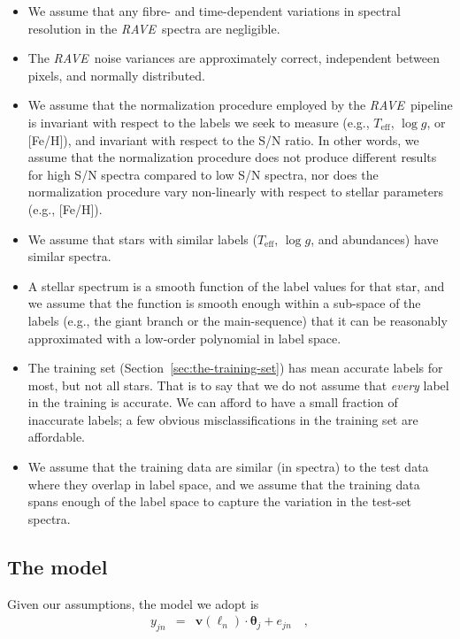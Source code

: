\documentclass[preprint]{aastex}
\newcommand{\acronym}[1]{{\small{#1}}}
\newcommand{\project}[1]{\textsl{#1}}
\newcommand{\rave}{\project{\acronym{RAVE}}}
\newcommand{\teff}{T_{\mathrm{eff}}}
\newcommand{\logg}{\log g}
\newcommand{\Dvector}[1]{\boldsymbol{#1}}
\newcommand{\vectheta}{\Dvector{\theta}}
\newcommand{\vecv}{\Dvector{v}}
\begin{document}
\begin{itemize}
\item We assume that any fibre- and time-dependent variations in spectral
resolution in the \rave\ spectra are negligible.
\item The \rave\ noise variances are approximately correct, independent between
pixels, and normally distributed.
\item We assume that the normalization procedure employed by the \rave\ pipeline
is invariant with respect to the labels we seek to measure (e.g., $\teff$, $\logg$,
or [Fe/H]), and invariant with respect to the S/N ratio.  In other words, we assume
that the normalization procedure does not produce different results for high S/N
spectra compared to low S/N spectra, nor does the normalization procedure vary 
non-linearly with respect to stellar parameters (e.g., [Fe/H]).
\item We assume that stars with similar labels ($\teff$, $\logg$, and abundances)
have similar spectra.
\item A stellar spectrum is a smooth function of the label values for that star,
and we assume that the function is smooth enough within a sub-space of the labels
(e.g., the giant branch or the main-sequence) that it can be reasonably approximated 
with a low-order polynomial in label space.
\item The training set (Section~\ref{sec:the-training-set}) has mean accurate labels
for most, but not all stars. That is to say that we do not assume that \emph{every} 
label in the training is accurate. We can afford to have a small fraction of 
inaccurate labels; a few obvious misclassifications in the training set are affordable.
\item We assume that the training data are similar (in spectra) to the test data 
where they overlap in label space, and we assume that the training data spans enough
of the label space to capture the variation in the test-set spectra.
\end{itemize}


\subsection{The model}
\label{sec:the-model}


\noindent{}Given our assumptions, the model we adopt is
\begin{eqnarray}\label{eq:model}
y_{jn} & = & \vecv(\ell_n)\cdot\vectheta_j + e_{jn}\quad ,
\end{eqnarray}
\end{document}
